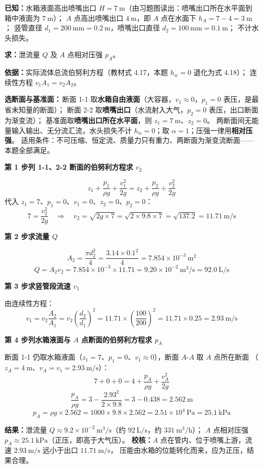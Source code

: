 \begin{jie}
\textbf{已知：}水箱液面高出喷嘴出口 $H=7\ \mathrm{m}$（由习题图读出：喷嘴出口所在水平面到箱中液面为 $7\ \mathrm{m}$）；
$A$ 点高出喷嘴出口 $4\ \mathrm{m}$，即 $A$ 点在水面下 $h_A=7-4=3\ \mathrm{m}$；
竖管直径 $d_1=200\ \mathrm{mm}=0.2\ \mathrm{m}$，喷嘴出口直径 $d_2=100\ \mathrm{mm}=0.1\ \mathrm{m}$；
不计水头损失。

\textbf{求：}泄流量 $Q$ 及 $A$ 点相对压强 $p_A$。

\textbf{依据：}实际流体总流伯努利方程（教材式 4.17，本题 $h_w=0$ 退化为式 4.18）；
连续性方程 $v_1A_1=v_2A_2$。

\textbf{选断面与基准面：}\,断面 1-1 取\textbf{水箱自由液面}（大容器，$v_1\approx0$，$p_1=0$ 表压，是最省未知量的断面）；
断面 2-2 取\textbf{喷嘴出口}（水流射入大气，$p_2=0$ 表压，出口断面为渐变流）；
基准面取\textbf{喷嘴出口所在水平面}，则 $z_1=7\ \mathrm{m}$、$z_2=0$。
两断面间无能量输入输出、无分流汇流，水头损失不计 $h_w=0$；取 $\alpha=1$；压强一律用\textbf{相对压强}。
适用条件：不可压缩、恒定流、质量力只有重力、两断面为渐变流断面——本题全部满足。

\textbf{第 1 步\quad 列 1-1、2-2 断面的伯努利方程求 $v_2$}

\[ z_1+\frac{p_1}{\rho g}+\frac{v_1^2}{2g}=z_2+\frac{p_2}{\rho g}+\frac{v_2^2}{2g} \]
代入 $z_1=7$、$p_1=0$、$v_1=0$、$z_2=0$、$p_2=0$：
\[ 7=\frac{v_2^2}{2g}\quad\Longrightarrow\quad v_2=\sqrt{2g\times7}=\sqrt{2\times9.8\times7}=\sqrt{137.2}=11.71\ \mathrm{m/s} \]

\textbf{第 2 步\quad 求流量 $Q$}

\[ A_2=\frac{\pi d_2^2}{4}=\frac{3.14\times0.1^2}{4}=7.854\times10^{-3}\ \mathrm{m^2} \]
\[ Q=A_2v_2=7.854\times10^{-3}\times11.71=9.20\times10^{-2}\ \mathrm{m^3/s}=92.0\ \mathrm{L/s} \]

\textbf{第 3 步\quad 求竖管段流速 $v_1$}

由连续性方程：
\[ v_1=v_2\frac{A_2}{A_1}=v_2\left(\frac{d_2}{d_1}\right)^2=11.71\times\left(\frac{100}{200}\right)^2
   =11.71\times0.25=2.93\ \mathrm{m/s} \]

\textbf{第 4 步\quad 列水箱液面与 $A$ 点断面的伯努利方程求 $p_A$}

断面 1-1 仍取水箱液面（$z_1=7$、$p_1=0$、$v_1\approx0$），断面 $A$-$A$ 取 $A$ 点所在断面
（$z_A=4\ \mathrm{m}$、$v_A=v_1=2.93\ \mathrm{m/s}$）：
\[ 7+0+0=4+\frac{p_A}{\rho g}+\frac{v_A^2}{2g} \]
\[ \frac{p_A}{\rho g}=3-\frac{2.93^2}{2\times9.8}=3-0.438=2.562\ \mathrm{m} \]
\[ p_A=\rho g\times2.562=1000\times9.8\times2.562=2.51\times10^4\ \mathrm{Pa}=25.1\ \mathrm{kPa} \]

\textbf{结果：}泄流量 $Q\approx9.2\times10^{-2}\ \mathrm{m^3/s}$（约 $92\ \mathrm{L/s}$，约 $331\ \mathrm{m^3/h}$）；
$A$ 点相对压强 $p_A\approx25.1\ \mathrm{kPa}$（正压，即高于大气压）。
\textbf{校核：}$A$ 点在管内、位于喷嘴上游，流速 $2.93\ \mathrm{m/s}$ 远小于出口 $11.71\ \mathrm{m/s}$，
压能由水箱的位能转化而来，应为正压，结果合理。
\end{jie}

